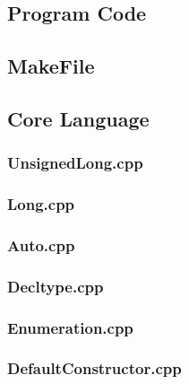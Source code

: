 \documentclass[11pt]{report}
\newcommand{\Cpp}{\lstset{language=C++,keywordstyle=\bfseries,breaklines,breakindent=30pt}}
\newcommand{\Make}{\lstset{language=make}}
\begin{document}
\begin{appendix}

\chapter{Program Code}
\label{cha:Programcode}


\section{MakeFile}
\label{Makefile}

\Make


\newpage

\section{Core Language}
\label{Appendix: corelanguage}

\Cpp

\subsection{UnsignedLong.cpp}
\label{sub:UnsignedLong.cpp}


\subsection{Long.cpp}
\label{sub:LongLong}

\newpage

\subsection{Auto.cpp}
\label{sub:Auto}


\subsection{Decltype.cpp}
\label{sub:Decltype}

\newpage

\subsection{Enumeration.cpp}
\label{sub:Enumeration}


\subsection{DefaultConstructor.cpp}
\label{sub:DefaultConstructor}



\end{appendix}
\end{document}
